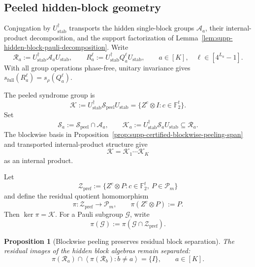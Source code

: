 \documentclass[
  aps,
  prx,
  reprint,
  superscriptaddress,
  amsmath,
  amssymb,
  nofootinbib,
  longbibliography
]{revtex4-2}
\newtheorem{proposition}[theorem]{Proposition}
\newcommand{\Pc}{\mathcal{P}}
\newcommand{\Fc}{\mathbb{F}_2}
\begin{document}
\subsection{Peeled hidden-block geometry}

Conjugation by $U_{\mathrm{stab}}^\dagger$ transports the hidden
single-block groups $\mathcal A_a$, their internal-product decomposition,
and the support factorization of
Lemma~\ref{lem:supp-hidden-block-pauli-decomposition}.  Write
\begin{equation}
\mathcal R_a
:=
U_{\mathrm{stab}}^\dagger\mathcal A_aU_{\mathrm{stab}},
\qquad
R_a^\ell
:=
U_{\mathrm{stab}}^\dagger Q_a^\ell U_{\mathrm{stab}},
\qquad
a\in[K],
\quad
\ell\in[4^{L_a}-1].
\label{eq:supp-peeled-block-operators}
\end{equation}
With all group operations phase-free, unitary invariance gives
$s_{\mathrm{full}}(R_a^\ell)=s_\rho(Q_a^\ell)$.

The peeled syndrome group is
\begin{equation}
\mathcal K
:=
U_{\mathrm{stab}}^\dagger
\mathcal S_{\mathrm{peel}}
U_{\mathrm{stab}}
=
\{Z^c\otimes I:c\in\Fc^t\}.
\label{eq:supp-peeled-kernel-blockwise-proof}
\end{equation}
Set
\begin{equation}
\mathcal S_a
:=
\mathcal S_{\mathrm{peel}}\cap\mathcal A_a,
\qquad
\mathcal K_a
:=
U_{\mathrm{stab}}^\dagger\mathcal S_aU_{\mathrm{stab}}
\subseteq\mathcal R_a.
\end{equation}
The blockwise basis in
Proposition~\ref{prop:supp-certified-blockwise-peeling-span} and transported
internal-product structure give
\begin{equation}
\mathcal K
=
\mathcal K_1\cdots\mathcal K_K
\label{eq:supp-blockwise-kernel-factorization}
\end{equation}
as an internal product.

Let
\begin{equation}
\mathcal Z_{\mathrm{pref}}
:=
\{Z^c\otimes P:c\in\Fc^t,\ P\in\Pc_m\}
\end{equation}
and define the residual quotient homomorphism
\begin{equation}
\pi:\mathcal Z_{\mathrm{pref}}\longrightarrow\Pc_m,
\qquad
\pi(Z^c\otimes P):=P.
\end{equation}
Then $\ker\pi=\mathcal K$.  For a Pauli subgroup $\mathcal G$, write
\begin{equation}
\pi(\mathcal G)
:=
\pi(\mathcal G\cap\mathcal Z_{\mathrm{pref}}).
\end{equation}
\begin{proposition}[Blockwise peeling preserves residual block separation]
\label{prop:supp-blockwise-peeling-preserves-residual-blocks}
The residual images of the hidden block algebras
remain separated:
\begin{equation}
\pi(\mathcal R_a)
\cap
\left\langle
\pi(\mathcal R_b): b\ne a
\right\rangle
=
\{I\},
\qquad
a\in[K].
\label{eq:supp-residual-block-separation}
\end{equation}
\end{proposition}
\end{document}
